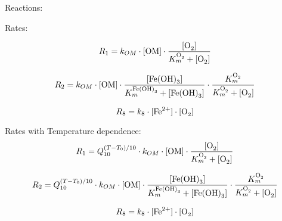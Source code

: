 \documentclass[12pt,a4paper]{article}
\date {}
\begin{document}
Reactions:





Rates:

\begin{equation}
  R_1 = k_{OM} \cdot [\ce{OM}] \cdot \frac{[\ce{O2}]}{K^{\ce{O2}}_m + [\ce{O2}]}
\end{equation}

\begin{equation}
  R_2 = k_{OM} \cdot [\ce{OM}] \cdot \frac{[\ce{Fe(OH)3}]}{K^{\ce{Fe(OH)3}}_m + [\ce{Fe(OH)3}]} \cdot \frac{K^{\ce{O2}}_m}{K^{\ce{O2}}_m + [\ce{O2}]}
\end{equation}

\begin{equation}
  R_8 = k_8 \cdot [\ce{Fe^{2+}}]\cdot [\ce{O2}]
\end{equation}


Rates with Temperature dependence:
\begin{equation}
  R_1 = Q_{10}^{(T-T_0)/10} \cdot k_{OM} \cdot [\ce{OM}] \cdot \frac{[\ce{O2}]}{K^{\ce{O2}}_m + [\ce{O2}]}
\end{equation}

\begin{equation}
  R_2 = Q_{10}^{(T-T_0)/10} \cdot k_{OM} \cdot [\ce{OM}] \cdot \frac{[\ce{Fe(OH)3}]}{K^{\ce{Fe(OH)3}}_m + [\ce{Fe(OH)3}]} \cdot \frac{K^{\ce{O2}}_m}{K^{\ce{O2}}_m + [\ce{O2}]}
\end{equation}

\begin{equation}
  R_8 = k_8 \cdot [\ce{Fe^{2+}}]\cdot [\ce{O2}]
\end{equation}



\end{document}
